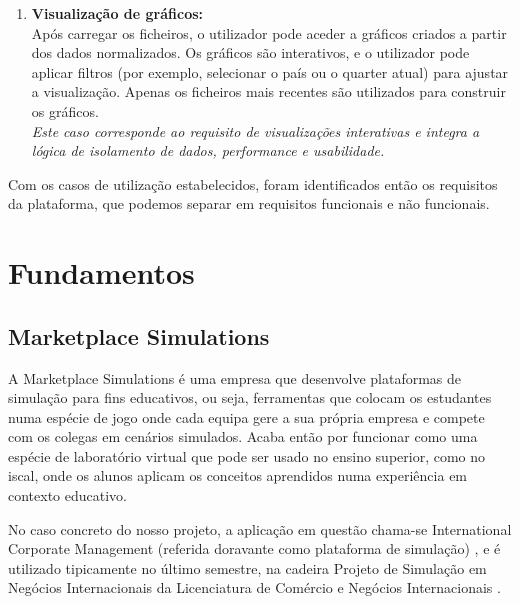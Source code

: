 \begin{enumerate}
    \item \textbf{Visualização de gráficos: } \\
    Após carregar os ficheiros, o utilizador pode aceder a gráficos criados a partir dos dados normalizados. Os gráficos são interativos, e o utilizador pode aplicar filtros (por exemplo, selecionar o país ou o quarter atual) para ajustar a visualização. Apenas os ficheiros mais recentes são utilizados para construir os gráficos. \\
    \textit{Este caso corresponde ao requisito de visualizações interativas e integra a lógica de isolamento de dados, performance e usabilidade.}
    
\end{enumerate}

Com os casos de utilização estabelecidos, foram identificados então os requisitos da plataforma, que podemos separar em requisitos funcionais e não funcionais.

\section{Fundamentos}
\label{sec:fundamentos}


\subsection{Marketplace Simulations}
A Marketplace Simulations  é uma empresa que desenvolve plataformas de simulação para fins educativos, ou seja, ferramentas que colocam os estudantes numa espécie de jogo onde cada equipa gere a sua própria empresa e compete com os colegas em cenários simulados. Acaba então por funcionar como uma espécie de laboratório virtual que pode ser usado no ensino superior, como no \gls{iscal}, onde os alunos aplicam os conceitos aprendidos numa experiência em contexto educativo.

No caso concreto do nosso projeto, a aplicação em questão chama-se International Corporate Management (referida doravante como plataforma de simulação) \cite{MarketplaceSim_2025}, e é utilizado tipicamente no último semestre, na cadeira Projeto de Simulação em Negócios Internacionais da Licenciatura de Comércio e Negócios Internacionais \cite{FUC_ISCAL_2025}. 

